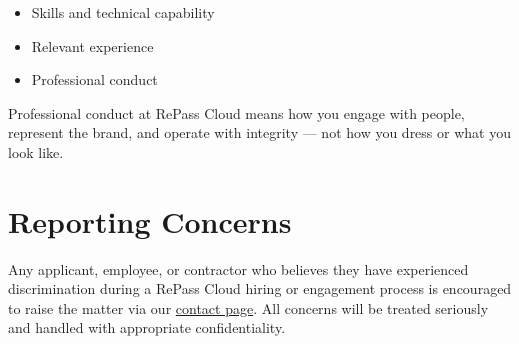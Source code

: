 \documentclass[11pt]{article}
\begin{document}
\begin{itemize}
\item Skills and technical capability
\item Relevant experience
\item Professional conduct
\end{itemize}

Professional conduct at RePass Cloud means how you engage with people, represent the brand, and operate with integrity --- not how you dress or what you look like.

\section{Reporting Concerns}

Any applicant, employee, or contractor who believes they have experienced discrimination during a RePass Cloud hiring or engagement process is encouraged to raise the matter via our \href{/contact/}{contact page}. All concerns will be treated seriously and handled with appropriate confidentiality.
\end{document}
